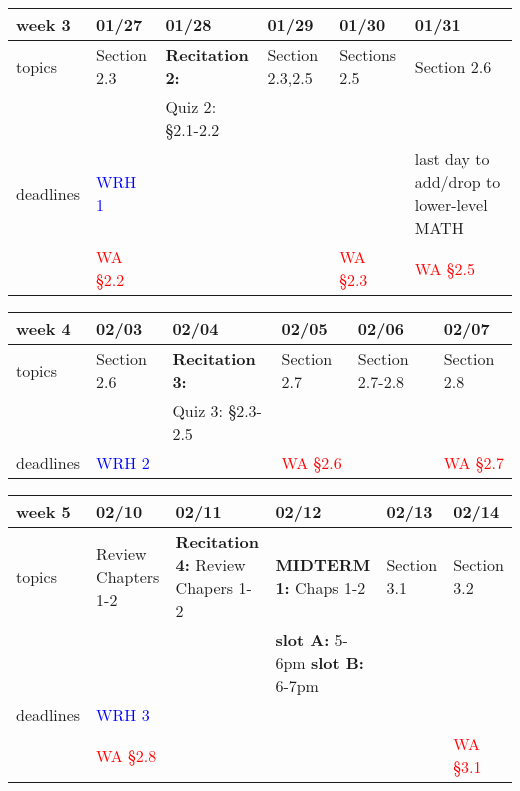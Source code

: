 \documentclass[11pt]{article}
\begin{document}
\begin{center}
\begin{tabularx}{\textwidth}{|p{1.5cm}|| L | L | L | L | L |}
\hline
week 3&01/27&01/28&01/29&01/30&01/31\\ \hline
topics&Section 2.3&\textbf{Recitation 2:} &Section 2.3,2.5 &Sections 2.5&Section 2.6\\
&&{Quiz 2}: \S 2.1-2.2&&&\\ \hline
deadlines& \textcolor{blue}{WRH 1} & && & \textcolor{ddgreen}{last day to add/drop to lower-level MATH}\\
&\textcolor{red}{WA \S 2.2} &&&\textcolor{red}{WA \S 2.3}&\textcolor{red}{WA \S 2.5}\\ \hline 
\end{tabularx} \end{center}

\begin{center}
\begin{tabularx}{\textwidth}{|p{1.5cm}|| L | L | L | L | L |}
\hline
week 4&02/03&02/04&02/05&02/06&02/07\\ \hline
topics&Section 2.6&\textbf{Recitation 3:}&Section 2.7&Section 2.7-2.8&Section 2.8\\ 
&&{Quiz 3}: \S 2.3-2.5&&& \\ \hline
deadlines&\textcolor{blue}{WRH 2} & &\textcolor{red}{WA \S 2.6}&&\textcolor{red}{WA \S 2.7} \\ 
 \hline \end{tabularx} \end{center}
 
\begin{center}
\begin{tabularx}{\textwidth}{|p{1.5cm}|| L | L | L | L | L |}
\hline
week 5&02/10&02/11&02/12&02/13&02/14\\ \hline
topics &Review Chapters 1-2&\textbf{Recitation 4:} Review Chapers 1-2&\textcolor{dcyan}{\textbf{MIDTERM 1: }} Chaps 1-2&Section 3.1&Section 3.2\\
&&&\textcolor{ddgreen}{\textbf{slot A:} 5-6pm  \textbf{slot B:} 6-7pm}&&\\ \hline
deadlines&\textcolor{blue}{WRH 3} & &&& \\ 
&\textcolor{red}{WA \S 2.8}&&&&\textcolor{red}{WA \S 3.1}\\ \hline \hline
\end{tabularx}
\end{center}
\end{document}
